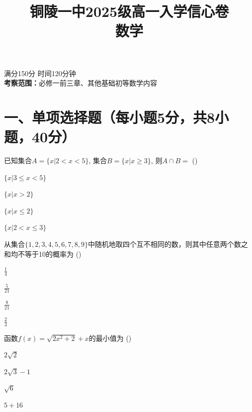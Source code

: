 \documentclass[12pt, a4paper]{ctexart}
\title{铜陵一中2025级高一入学信心卷 \\ \vspace{0.5cm} 数学}
\author{}
\date{}
\def\paren{\leavevmode\unskip\nobreak\quad(\quad\quad)}
\newenvironment{choices}{\begin{list}{}{\setlength{\leftmargin}{2em}\setlength{\labelwidth}{1.5em}}}{\end{list}}
\renewcommand{\item}[1]{\item[#1]} %
\begin{document}
\maketitle
\thispagestyle{empty}

\begin{center}
    \large
    满分150分 \quad 时间120分钟 \\
    \vspace{0.5cm}
    \textbf{考察范围：}必修一前三章、其他基础初等数学内容
\end{center}

\vspace{1cm}

\section*{一、单项选择题（每小题5分，共8小题，40分）}

\begin{question}
    已知集合$A=\{x|2<x<5\}$, 集合$B=\{x|x\ge3\}$, 则$A\cap B=$ \paren
    \begin{choices}
        \item    $\{x|3\le x<5\}$
        \item    $\{x|x>2\}$
        \item    $\{x|x\le2\}$
        \item    $\{x|2<x\le3\}$
    \end{choices}
\end{question}

\begin{question}
    从集合$\{1,2,3,4,5,6,7,8,9\}$中随机地取四个互不相同的数，则其中任意两个数之和均不等于10的概率为 \paren
    \begin{choices}
        \item    $\frac{1}{4}$
        \item    $\frac{5}{21}$
        \item    $\frac{8}{21}$
        \item    $\frac{2}{3}$
    \end{choices}
\end{question}

\begin{question}
    函数$f(x)= \sqrt{2x^2+2} +x$的最小值为 \paren
    \begin{choices}
        \item    $2\sqrt{2}$
        \item    $2\sqrt{3}-1$
        \item    $\sqrt{6}$
        \item    $5 + 16$
    \end{choices}
\end{question}
\end{document}
